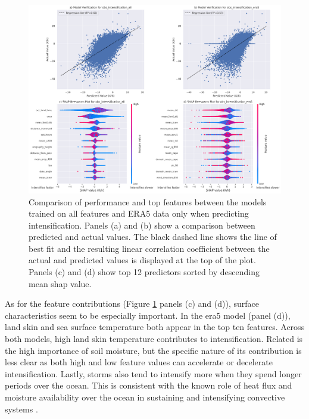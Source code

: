 \begin{figure}[ht]
    \centering
    \includegraphics[width=\textwidth]{../figures/generated/experiments/obs_intensification/obs_intensification_summary.png}
    \caption{Comparison of performance and top features between the models trained on all features and ERA5 data only when predicting intensification. Panels (a) and (b) show a comparison between predicted and actual values. The black dashed line shows the line of best fit and the resulting linear correlation coefficient between the actual and predicted values is displayed at the top of the plot. Panels (c) and (d) show top 12 predictors sorted by descending mean \acrshort{shap} value.}
    \label{fig:obs_intensification_summary}
\end{figure}

As for the feature contributions (Figure \ref{fig:obs_intensification_summary} panels (c) and (d)), surface characteristics seem to be especially important. In the \acrshort{era5} model (panel (d)), land skin and sea surface temperature both appear in the top ten features. Across both models, high land skin temperature contributes to intensification. Related is the high importance of soil moisture, but the specific nature of its contribution is less clear as both high and low feature values can accelerate or decelerate intensification. Lastly, storms also tend to intensify more when they spend longer periods over the ocean. This is consistent with the known role of heat flux and moisture availability over the ocean in sustaining and intensifying convective systems \citep{Klein2021,Sud1998,Abbott2025}.

